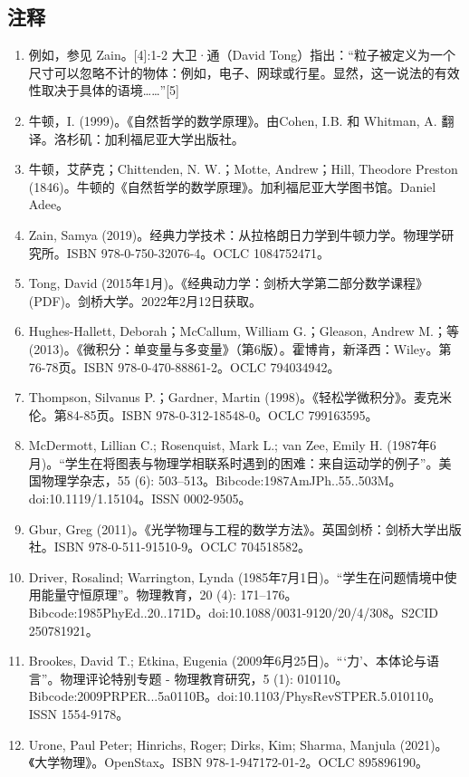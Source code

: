 \subsection{注释}
\begin{enumerate}
\item 例如，参见 Zain。[4]:1-2 大卫·通（David Tong）指出：“粒子被定义为一个尺寸可以忽略不计的物体：例如，电子、网球或行星。显然，这一说法的有效性取决于具体的语境……”[5]
\item 牛顿，I. (1999)。《自然哲学的数学原理》。由Cohen, I.B. 和 Whitman, A. 翻译。洛杉矶：加利福尼亚大学出版社。
\item 牛顿，艾萨克；Chittenden, N. W.；Motte, Andrew；Hill, Theodore Preston (1846)。牛顿的《自然哲学的数学原理》。加利福尼亚大学图书馆。Daniel Adee。
\item Zain, Samya (2019)。经典力学技术：从拉格朗日力学到牛顿力学。物理学研究所。ISBN 978-0-750-32076-4。OCLC 1084752471。
\item Tong, David (2015年1月)。《经典动力学：剑桥大学第二部分数学课程》 (PDF)。剑桥大学。2022年2月12日获取。
\item Hughes-Hallett, Deborah；McCallum, William G.；Gleason, Andrew M.；等 (2013)。《微积分：单变量与多变量》（第6版）。霍博肯，新泽西：Wiley。第76-78页。ISBN 978-0-470-88861-2。OCLC 794034942。
\item Thompson, Silvanus P.；Gardner, Martin (1998)。《轻松学微积分》。麦克米伦。第84-85页。ISBN 978-0-312-18548-0。OCLC 799163595。
\item McDermott, Lillian C.; Rosenquist, Mark L.; van Zee, Emily H. (1987年6月)。“学生在将图表与物理学相联系时遇到的困难：来自运动学的例子”。美国物理学杂志，55 (6): 503–513。Bibcode:1987AmJPh..55..503M。doi:10.1119/1.15104。ISSN 0002-9505。
\item Gbur, Greg (2011)。《光学物理与工程的数学方法》。英国剑桥：剑桥大学出版社。ISBN 978-0-511-91510-9。OCLC 704518582。
\item Driver, Rosalind; Warrington, Lynda (1985年7月1日)。“学生在问题情境中使用能量守恒原理”。物理教育，20 (4): 171–176。Bibcode:1985PhyEd..20..171D。doi:10.1088/0031-9120/20/4/308。S2CID 250781921。
\item Brookes, David T.; Etkina, Eugenia (2009年6月25日)。“‘力’、本体论与语言”。物理评论特别专题 - 物理教育研究，5 (1): 010110。Bibcode:2009PRPER...5a0110B。doi:10.1103/PhysRevSTPER.5.010110。ISSN 1554-9178。
\item Urone, Paul Peter; Hinrichs, Roger; Dirks, Kim; Sharma, Manjula (2021)。《大学物理》。OpenStax。ISBN 978-1-947172-01-2。OCLC 895896190。

\end{enumerate}
